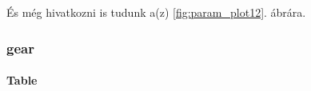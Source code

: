 \documentclass[
]{article}
\begin{document}
És még hivatkozni is tudunk a(z) \ref{fig:param_plot12}. ábrára.

\hypertarget{gear}{%
\subsubsection{gear}\label{gear}}

\hypertarget{table-1}{%
\paragraph{Table}\label{table-1}}

 
  \providecommand{\huxb}[2]{\arrayrulecolor[RGB]{#1}\global\arrayrulewidth=#2pt}
  \providecommand{\huxvb}[2]{\color[RGB]{#1}\vrule width #2pt}
  \providecommand{\huxtpad}[1]{\rule{0pt}{#1}}
  \providecommand{\huxbpad}[1]{\rule[-#1]{0pt}{#1}}
\end{document}

